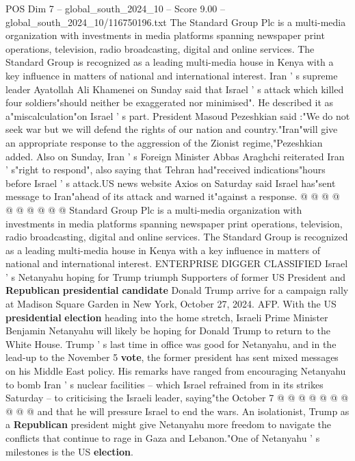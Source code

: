\begin{textsample}{POS Dim 7 – global\_south\_2024\_10 – Score 9.00 – global\_south\_2024\_10/116750196.txt}  \label{ex:f7_pos_220}
The Standard Group Plc is a multi-media organization with investments in media platforms spanning newspaper print operations, television, radio broadcasting, digital and online services.
The Standard Group is recognized as a leading multi-media house in Kenya with a key influence in matters of national and international interest.
Iran ' s supreme leader Ayatollah Ali Khamenei on Sunday said that Israel ' s attack which killed four soldiers"should neither be exaggerated nor minimised".
He described it as a"miscalculation"on Israel ' s part.
President Masoud Pezeshkian said :"We do not seek war but we will defend the rights of our nation and country."Iran"will give an appropriate response to the aggression of the Zionist regime,"Pezeshkian added.
Also on Sunday, Iran ' s Foreign Minister Abbas Araghchi reiterated Iran ' s"right to respond", also saying that Tehran had"received indications"hours before Israel ' s attack.US news website Axios on Saturday said Israel has"sent message to Iran"ahead of its attack and warned it"against a response. @ @ @ @ @ @ @ @ @ @ Standard Group Plc is a multi-media organization with investments in media platforms spanning newspaper print operations, television, radio broadcasting, digital and online services.
The Standard Group is recognized as a leading multi-media house in Kenya with a key influence in matters of national and international interest.
ENTERPRISE DIGGER CLASSIFIED Israel ' s Netanyahu hoping for Trump triumph Supporters of former US President and \textbf{Republican} \textbf{presidential} \textbf{candidate} Donald Trump arrive for a campaign rally at Madison Square Garden in New York, October 27, 2024.
AFP.
With the US \textbf{presidential} \textbf{election} heading into the home stretch, Israeli Prime Minister Benjamin Netanyahu will likely be hoping for Donald Trump to return to the White House.
Trump ' s last time in office was good for Netanyahu, and in the lead-up to the November 5 \textbf{vote}, the former president has sent mixed messages on his Middle East policy.
His remarks have ranged from encouraging Netanyahu to bomb Iran ' s nuclear facilities -- which Israel refrained from in its strikes Saturday -- to criticising the Israeli leader, saying"the October 7 @ @ @ @ @ @ @ @ @ @ and that he will pressure Israel to end the wars.
An isolationist, Trump as a \textbf{Republican} president might give Netanyahu more freedom to navigate the conflicts that continue to rage in Gaza and Lebanon."One of Netanyahu ' s milestones is the US \textbf{election}.

\end{textsample}
